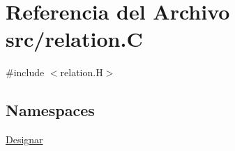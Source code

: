 \hypertarget{relation_8_c}{}\section{Referencia del Archivo src/relation.C}
\label{relation_8_c}
{\ttfamily \#include $<$relation.\+H$>$}\newline
\subsection*{Namespaces}
\begin{DoxyCompactItemize}
\item 
 \hyperlink{namespace_designar}{Designar}
\end{DoxyCompactItemize}
